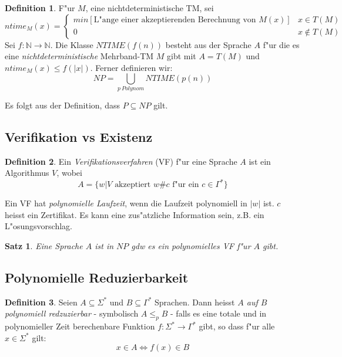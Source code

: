 \documentclass[german, 10pt, a4paper, twocolumn]{scrartcl}
\newtheorem{satz}{Satz}[section]
\theoremstyle{definition}
\newtheorem*{definition}{Definition}
\theoremstyle{example}
\begin{document}
\begin{definition}
	F"ur $M$, eine nichtdeterministische TM, sei
	\tiny
	\begin{displaymath}
		ntime_M(x) = \left \{
		\begin{array}{ll}
			min[\text{L"ange einer akzeptierenden Berechnung von } M(x)] &	x \in T(M)\\
			0 &								x \not\in T(M)
		\end{array}
		\right .
	\end{displaymath}
	\normalsize
	Sei $f: \mathbb{N} \to \mathbb{N}$. Die Klasse $NTIME(f(n))$ besteht aus der Sprache $A$ f"ur die es eine \textit{nichtdeterministische} Mehrband-TM $M$ gibt mit $A=T(M)$ und $ntime_M(x) \leq f(|x|)$. Ferner definieren wir:
	\begin{displaymath}
		NP = \bigcup_{p \ Polynom} NTIME(p(n))
	\end{displaymath}
\end{definition}

Es folgt aus der Definition, dass $P \subseteq NP$ gilt.

\subsection{Verifikation vs Existenz}

\begin{definition}
	Ein \textit{Verifikationsverfahren} (VF) f"ur eine Sprache $A$ ist ein Algorithmus $V$, wobei
	\begin{displaymath}
		A = \{ w | V \text{ akzeptiert } w\# c \text{ f"ur ein } c \in \Gamma^* \}
	\end{displaymath}
\end{definition}

Ein VF hat \textit{polynomielle Laufzeit}, wenn die Laufzeit polynomiell in $|w|$ ist. $c$ heisst ein Zertifikat. Es kann eine zus"atzliche Information sein, z.B. ein L"osungsvorschlag.

\begin{satz}
	Eine Sprache $A$ ist in $NP$ gdw es ein polynomielles VF f"ur $A$ gibt.
\end{satz}

\subsection{Polynomielle Reduzierbarkeit}


\begin{definition}
	Seien $A\subseteq \Sigma^*$ und $B\subseteq \Gamma^*$ Sprachen. Dann heisst \textit{$A$ auf $B$ polynomiell redzuzierbar} - symbolisch $A\leq_p B$ - falls es eine totale und in polynomieller Zeit berechenbare Funktion $f: \Sigma^* \to \Gamma^*$ gibt, so dass f"ur alle $x \in \Sigma^*$ gilt: 
	\begin{displaymath}
		x \in A \Leftrightarrow f(x) \in B
	\end{displaymath}
\end{definition}
\end{document}
